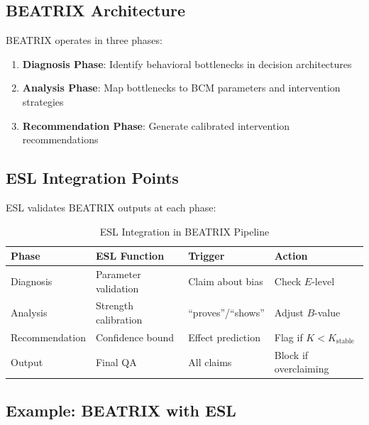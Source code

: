 \documentclass[11pt,a4paper]{article}
\begin{document}
\subsection{BEATRIX Architecture}

BEATRIX operates in three phases:

\begin{enumerate}
    \item \textbf{Diagnosis Phase}: Identify behavioral bottlenecks in decision architectures
    \item \textbf{Analysis Phase}: Map bottlenecks to BCM parameters and intervention strategies
    \item \textbf{Recommendation Phase}: Generate calibrated intervention recommendations
\end{enumerate}

\subsection{ESL Integration Points}

ESL validates BEATRIX outputs at each phase:

\begin{table}[h]
\centering
\caption{ESL Integration in BEATRIX Pipeline}
\begin{tabular}{llll}
\toprule
\textbf{Phase} & \textbf{ESL Function} & \textbf{Trigger} & \textbf{Action} \\
\midrule
Diagnosis & Parameter validation & Claim about bias & Check $E$-level \\
Analysis & Strength calibration & ``proves''/``shows'' & Adjust $B$-value \\
Recommendation & Confidence bound & Effect prediction & Flag if $K < K_{\text{stable}}$ \\
Output & Final QA & All claims & Block if overclaiming \\
\bottomrule
\end{tabular}
\end{table}

\subsection{Example: BEATRIX with ESL}
\end{document}
